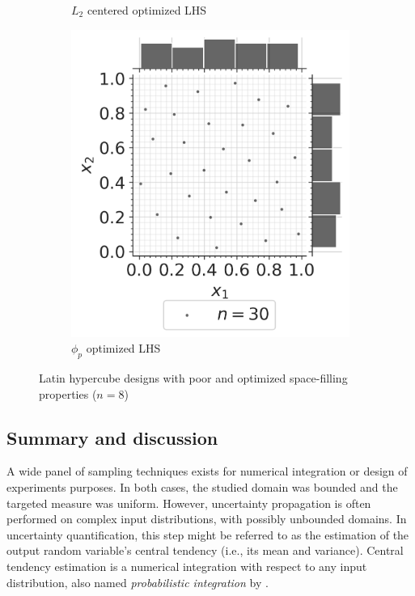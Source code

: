 \begin{figure}[ht]
\begin{subfigure}[b]{0.32\textwidth}
        \caption{$L_2$ centered optimized LHS}
    \end{subfigure}
    \hfill
    \begin{subfigure}[b]{0.32\textwidth}
        \centering
        \includegraphics[width=\textwidth]{../numerical_experiments/chapter1/figures/optimized_phip_LHS.png}
        \caption{$\phi_p$ optimized LHS}
    \end{subfigure}
       \caption{Latin hypercube designs with poor and optimized space-filling properties ($n=8$)}
       \label{fig:LHS_designs}
\end{figure}

\subsection{Summary and discussion}


A wide panel of sampling techniques exists for numerical integration or design of experiments purposes. 
In both cases, the studied domain was bounded and the targeted measure was uniform. 
However, uncertainty propagation is often performed on complex input distributions, with possibly unbounded domains. 
In uncertainty quantification, this step might be referred to as the estimation of the output random variable's central tendency (i.e., its mean and variance).
Central tendency estimation is a numerical integration with respect to any input distribution, also named \textit{probabilistic integration} by \citet{briol_oates_2019}.  

